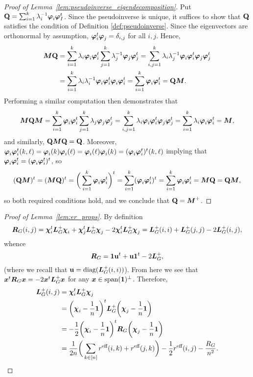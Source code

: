 \begin{proof}[Proof of Lemma~\ref{lem:pseudoinverse_eigendecomposition}]
	Put $\vb{Q}=\sum_{i=1}^k \lambda_i^{-1}\vb*{\varphi}_i\vb*{\varphi}_I^t$. Since the pseudoinverse is unique, it suffices to show that $\vb{Q}$ satisfies the condition of Definition \ref{def:pseudoinverse}.
	Since the eigenvectors are orthonormal by assumption, $\vb*{\varphi}_i^t\vb*{\varphi}_j=\delta_{i,j}$ for all $i,j$. Hence,  
	\begin{align*}
	{\vb*{M}}\vb{Q}&= \sum_{i=1}^k \lambda_i\vb*{\varphi}_i\vb*{\varphi}_i^t \sum_{j=1}^k \lambda_j^{-1}\vb*{\varphi}_j\vb*{\varphi}_j^t = \sum_{i,j=1}^k \lambda_i\lambda_j^{-1} \vb*{\varphi}_i\vb*{\varphi}_i^t \vb*{\varphi}_j\vb*{\varphi}_j^t \\
	&= \sum_{i=1}^k \lambda_i\lambda_i^{-1} \vb*{\varphi}_i\vb*{\varphi}_i^t\vb*{\varphi}_i\vb*{\varphi}_i^t 
	= \sum_{i=1}^k \vb*{\varphi}_i\vb*{\varphi}_i^t = \vb{Q}{\vb*{M}}.
	\end{align*}
	Performing a similar computation then demonstrates that 
	\[{\vb*{M}}\vb{Q}{\vb*{M}} = \sum_{i=1}^k \vb*{\varphi}_i\vb*{\varphi}_i^t \sum_{j=1}^k \lambda_j\vb*{\varphi}_j\vb*{\varphi}_j^t=\sum_{i,j=1}^k\lambda_i \vb*{\varphi}_i\vb*{\varphi}_i^t\vb*{\varphi}_j\vb*{\varphi}_j^t=\sum_{i=1}^k \lambda_i \vb*{\varphi}_i\vb*{\varphi}_i^t ={\vb*{M}},\]
	and similarly, $\vb{Q}{\vb*{M}}\vb{Q}=\vb{Q}$. Moreover, $\vb*{\varphi}_i\vb*{\varphi}_i^t (k,\ell)=\vb*{\varphi}_i(k)\vb*{\varphi}_i(\ell)=\vb*{\varphi}_i(\ell)\vb*{\varphi}_i(k)=(\vb*{\varphi}_i\vb*{\varphi}_i^t)^t (k,\ell)$ implying that $\vb*{\varphi}_i\vb*{\varphi}_i^t=(\vb*{\varphi}_i\vb*{\varphi}_i^t)^t$, so 
	\[(\vb{Q}{\vb*{M}})^t=({\vb*{M}}\vb{Q})^t =\bigg(\sum_{i=1}^k \vb*{\varphi}_i\vb*{\varphi}_i^t \bigg)^t = \sum_{i=1}^k (\vb*{\varphi}_i\vb*{\varphi}_i^t)^t = \sum_{i=1}^k \vb*{\varphi}_i\vb*{\varphi}_i^t={\vb*{M}}\vb{Q}=\vb{Q}{\vb*{M}},\]
	so both required conditions hold, and we conclude that $\vb{Q}={\vb*{M}}^+$. 
\end{proof}

\begin{proof}[Proof of Lemma~\ref{lem:er_props}]
	By definition 
	\begin{equation*}
	\vb*{R}_G(i,j) = \boldsymbol{\chi}_i^t\vb*{L}_G^+\boldsymbol{\chi}_i + \boldsymbol{\chi}_j^t \vb*{L}_G^+\boldsymbol{\chi}_j -2 \boldsymbol{\chi}_i^t \vb*{L}_G^+\boldsymbol{\chi}_j = \vb*{L}_G^+(i,i) + \vb*{L}_G^+(j,j) - 2\vb*{L}_G^+(i,j),
	\end{equation*}
	whence
	\begin{equation*}
	\vb*{R}_G = \vb{1} \vb{u} ^t + \vb{u}\vb{1}^t - 2\vb*{L}_G^+,
	\end{equation*}
	(where we recall that  $\vb{u}=\text{diag}(\vb*{L}_G^+(i,i))$).  From here we  see that $\vb*{x}^t \vb*{R}_G\vb*{x} = -2\vb*{x}^t \vb*{L}_G^+\vb*{x}$ for any $\vb*{x}\in\textnormal{span}(\vb{1})^\perp$. Therefore, 
	\begin{align}
	\vb*{L}_G^+(i,j)&=\boldsymbol{\chi}_i^t \vb*{L}_G^+\boldsymbol{\chi}_j \notag \\
	&= \bigg(\boldsymbol{\chi}_i-\frac{1}{n}\vb{1}\bigg)^t \vb*{L}_G^+\bigg(\boldsymbol{\chi}_j-\frac{1}{n}\vb{1}\bigg) \notag \\
	&= -\frac{1}{2}\bigg(\boldsymbol{\chi}_i-\frac{1}{n}\vb{1}\bigg)^t \vb*{R}_G\bigg(\boldsymbol{\chi}_j-\frac{1}{n}\vb{1}\bigg) \notag \\
	&= \frac{1}{2n}\bigg(\sum_{k\in[n]}r^{\textnormal{eff}}(i,k)+r^{\textnormal{eff}}(j,k)\bigg) - \frac{1}{2}r^{\textnormal{eff}}(i,j) -\frac{R_G}{n^2}.\notag\qedhere 
	\end{align}
\end{proof}

